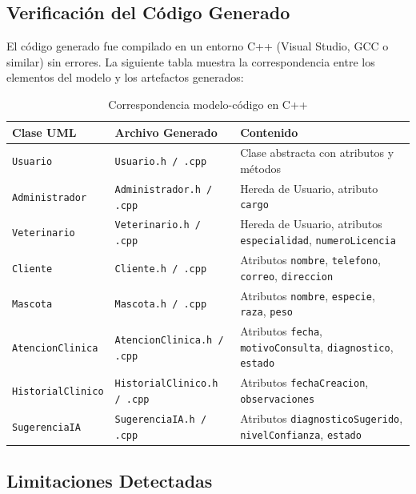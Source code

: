 \documentclass[12pt,a4paper]{article}
\begin{document}
\subsection{Verificación del Código Generado}

El código generado fue compilado en un entorno C++ (Visual Studio, GCC o similar) sin errores. La siguiente tabla muestra la correspondencia entre los elementos del modelo y los artefactos generados:

\begin{table}[H]
    \centering
    \caption{Correspondencia modelo-código en C++}
    \label{tab:correspondencia}
    \begin{tabular}{|p{3cm}|p{3cm}|p{6cm}|}
        \hline
        \textbf{Clase UML} & \textbf{Archivo Generado} & \textbf{Contenido} \\
        \hline
        \texttt{Usuario} & \texttt{Usuario.h / .cpp} & Clase abstracta con atributos y métodos \\
        \texttt{Administrador} & \texttt{Administrador.h / .cpp} & Hereda de Usuario, atributo \texttt{cargo} \\
        \texttt{Veterinario} & \texttt{Veterinario.h / .cpp} & Hereda de Usuario, atributos \texttt{especialidad}, \texttt{numeroLicencia} \\
        \texttt{Cliente} & \texttt{Cliente.h / .cpp} & Atributos \texttt{nombre}, \texttt{telefono}, \texttt{correo}, \texttt{direccion} \\
        \texttt{Mascota} & \texttt{Mascota.h / .cpp} & Atributos \texttt{nombre}, \texttt{especie}, \texttt{raza}, \texttt{peso} \\
        \texttt{AtencionClinica} & \texttt{AtencionClinica.h / .cpp} & Atributos \texttt{fecha}, \texttt{motivoConsulta}, \texttt{diagnostico}, \texttt{estado} \\
        \texttt{HistorialClinico} & \texttt{HistorialClinico.h / .cpp} & Atributos \texttt{fechaCreacion}, \texttt{observaciones} \\
        \texttt{SugerenciaIA} & \texttt{SugerenciaIA.h / .cpp} & Atributos \texttt{diagnosticoSugerido}, \texttt{nivelConfianza}, \texttt{estado} \\
        \hline
    \end{tabular}
\end{table}

\subsection{Limitaciones Detectadas}
\end{document}
